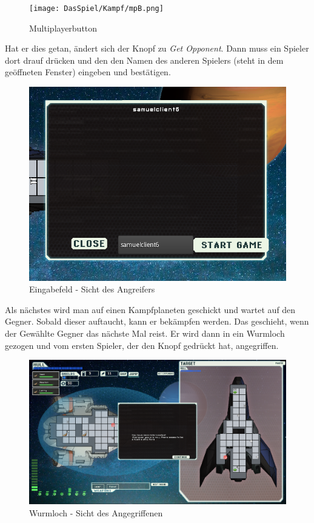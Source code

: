 \documentclass[fontsize=12pt,paper=a4,twoside]{scrartcl}
\begin{document}
\begin{figure}[H]
\centering
\texttt{[image: DasSpiel/Kampf/mpB.png]}
\caption{Multiplayerbutton}
\end{figure}

 Hat er dies getan, ändert sich der Knopf zu \textit{Get Opponent}. Dann muss ein Spieler dort drauf drücken und den den Namen des anderen Spielers (steht in dem geöffneten Fenster) eingeben und bestätigen.

\begin{figure}[H]
\centering
\includegraphics[width=0.8\linewidth]{DasSpiel/Kampf/join.png}
\caption{Eingabefeld - Sicht des Angreifers}
\end{figure}
 
 Als nächstes wird man auf einen Kampfplaneten geschickt und wartet auf den Gegner. Sobald dieser auftaucht, kann er bekämpfen werden. Das geschieht, wenn der Gewählte Gegner das nächste Mal reist. Er wird dann in ein Wurmloch gezogen und vom ersten Spieler, der den Knopf gedrückt hat, angegriffen. 

\begin{figure}[H]
\centering
\includegraphics[width=0.8\linewidth]{DasSpiel/Kampf/wurmloch.png}
\caption{Wurmloch - Sicht des Angegriffenen}
\end{figure}
\end{document}

